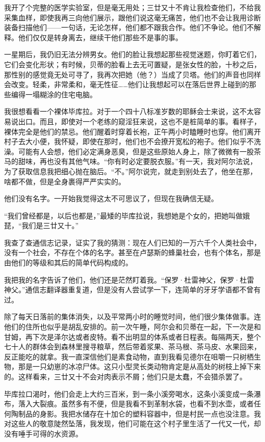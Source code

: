 \documentclass[AutoFakeBold=true]{book}
\begin{document}
我开了个完整的医学实验室，但是毫无用处；三廿又十不肯让我检查他们，不给我采集血样，即使我再三向他们展示，跟他们说这毫无痛苦，他们也不会让我用诊断装备扫描他们——一句话，无论怎样，他们都不跟我合作。他们不争论。他们不解释。他们仅仅是转身离去，继续干他们那些不是事的事。

一星期后，我仍旧无法分辨男女。他们的脸让我想起那些视觉迷题，你盯着它们，它们会变化形状；有时候，贝蒂的脸看上去无可置疑，是张女性的脸，十秒之后，那性别的感觉竟无处可寻了，我再次把她（他？）当成了贝塔。他们的声音也同样会改变。轻柔，非常柔和，毫无性征……他们让我想起可以在落后世界上碰到的那些编得一塌糊涂的住宅电脑。

我很想看看一个裸体毕库拉。对于一个四十八标准岁数的耶稣会士来说，这不太容易说出口。而且，即使对一个老练的窥淫狂来说，这也不是桩简单的事。看样子，裸体完全是他们的禁忌。他们醒着时穿着长袍，正午两小时瞌睡时也穿。他们离开村子去大小便，我怀疑，即使在那时，他们也不会撩开宽松的袍子。他们似乎不洗澡。可能有人会想，他们必定满身恶臭，但是这些原始人身上，除了微微有一股茶马的甜味，再也没有其他气味。``你有时必定要脱衣服。''有一天，我对阿尔法说，为了获取信息我把细心抛在脑后。``不。''阿尔说完，就走到别处去了，他坐在那，啥都不做，但是全身裹得严严实实的。

他们没有名字。一开始我觉得这太不可思议了，但现在我确信无疑。

``我们曾经都是，以后也都是，''最矮的毕库拉说，我想她是个女的，把她叫做娥琵，``我们是三廿又十。''

我查了查通信志记录，证实了我的猜测：现在人们已知的一万六千个人类社会中，没有一个社会，不存在个体的名字。甚至在卢瑟斯的蜂巢社会，也有个体名，那是由他们的等级和其后的简单代码构成的。

我把我的名字告诉了他们，他们还是茫然盯着我。``保罗·杜雷神父，保罗·杜雷神父。''通信志翻译器重复道，但是没有人尝试学一下，连简单的牙牙学语都不曾有过。

除了每天日落前的集体消失，以及平常两小时的睡觉时间，他们很少集体做事。连他们的住所也似乎是胡乱安排的。前一次午睡，阿尔会和贝蒂在一起，下一次是和甘姆，再下次是泽尔达或者皮特。看不出明显的体系或者日程表。每隔两天，整个七十人的群体会到森林里搜寻粮草，然后带着浆果、茶马根、茶马皮、水果回来，反正能吃的就拿。我一直深信他们是素食动物，直到我看见德尔在咀嚼一只树栖生物，那是一只幼崽的冰凉尸体。这只小型灵长类动物肯定是从高处的树枝上掉下来的。这样看来，三廿又十不会对肉表示不屑；他们只是太蠢，不会猎杀罢了。

毕库拉口渴时，他们会走上大约三百米，到一条小溪旁喝水，这条小溪变成一条瀑布，落入大裂痕。虽然多有不便，但是我看不到革制水袋，也看不到水壶，或者任何陶制品的身影。我把水储存在十加仑的塑料容器中，但是村民一点也没注意。我对这些人的敬意陡然坠落，我发现，他们可能在这个村子里生活了一代又一代，却没有唾手可得的水资源。
\end{document}

